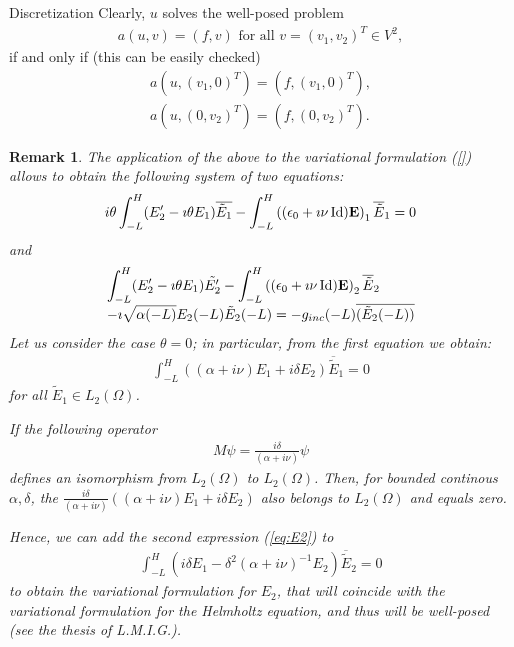 \documentclass[11pt]{amsart}
\newtheorem{remark}{Remark}
\newcommand{\E}{{\bf E}}
\begin{document}
\begin{subsection}{Discretization}
Clearly, $u$ solves the well-posed problem 
\begin{align*}
a(u, v)=(f,v)\text{ for all } v=(v_{1},v_{2})^{T}\in V^2, 
\end{align*}
if and only if (this can be easily checked)
\begin{align*}
a(u,(v_{1},0)^{T})=(f,(v_{1},0)^{T}),\\
a(u,(0,v_{2})^{T})=(f,(0,v_{2})^{T}).
\end{align*}


\begin{remark}
The application of the above to the variational formulation (\ref{}) allows to obtain the following system of two equations:
\[\begin{array}{l}
i\theta \displaystyle \int_{-L}^H (E_2' -\imath\theta E_1)\overline{\tilde E_1} - \int_{-L}^H \left((\epsilon_0 +\imath\nu \operatorname{Id}) \E\right)_{1} \overline{\tilde E}_{1}
=0
\end{array}
\]
and 
\begin{align}
\label{eq:E2}
\begin{array}{l}
\displaystyle \int_{-L}^H (E_2' -\imath\theta E_1)\tilde {E_2'} - \int_{-L}^H\left( (\epsilon_0 +\imath\nu\operatorname{Id}) \E\right)_{2}\overline{\tilde{E}}_{2}
\\ \displaystyle  - \imath \sqrt{\alpha(-L)} E_2 (-L) \tilde E_2 (-L) = -g_{inc} (-L) \overline{( \tilde E_2(-L) )} 
\end{array}
\end{align}
Let us consider the case $\theta=0$; in particular, from the first equation we obtain:
\begin{align*}
\int_{-L}^{H}\left((\alpha+i\nu)E_{1}+i\delta E_{2}\right)\overline{\tilde E}_{1}=0
\end{align*}
for all ${\tilde E}_{1}\in L_{2}(\Omega)$. 


If the following operator
\begin{align*}
M\psi = \frac{i\delta}{(\alpha+i\nu)}\psi
\end{align*}
defines an isomorphism from $L_{2}(\Omega)$ to $L_{2}(\Omega)$. Then, for bounded continous $\alpha, \delta$, the 
$\frac{i\delta}{(\alpha+i\nu)}\left((\alpha+i\nu)E_{1}+i\delta E_{2}\right)$ also belongs to $L_{2}(\Omega)$ and equals zero.

Hence, we can add the second expression (\ref{eq:E2}) to
\begin{align*}
\int_{-L}^{H}\left(i\delta E_{1}-\delta^2(\alpha+i\nu)^{-1} E_{2}\right)\overline{\tilde E}_{2}=0
\end{align*}
to obtain the variational formulation for $E_{2}$, that will coincide with the variational formulation for the Helmholtz equation, and thus will be well-posed (see the thesis of L.M.I.G.).


\end{remark}
\end{subsection}
\end{document}
